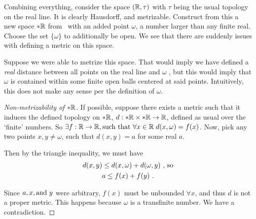 \begin{frame}

    Combining everything, consider the space \((\mathbb{R}, \tau)\) with \(\tau\)
    being the usual topology on the real line. It is clearly Hausdorff, and
    metrizable. \pause Construct from this a new space \(*\mathbb{R}\) from \reals\,
    with an added point \(\omega\), a number larger than any finite real. Choose
    the set \(\{\omega\}\) to additionally be open. \pause We see that there are
    suddenly issues with defining a metric on this space.

\end{frame}

\begin{frame}

    Suppose we were able to metrize this space. That would imply we have defined
    a \emph{real} distance between all points on the real line and \(\omega\)
    \pause, but this would imply that \(\omega\) is contained within some finite
    open balls centered at said points. Intuitively, this does not make any
    sense per the definition of \(\omega\).

\end{frame}

\begin{frame}

    \begin{proof}[Non-metrizability of \(*\mathbb{R}\)]
        If possible, suppose there exists a metric such that it induces the
        defined topology on \(*\mathbb{R}\), \(d:*\mathbb{R} \times *\mathbb{R} \to
        \mathbb{R}\), defined as usual over the `finite' numbers. \pause So
        \(\exists f:\mathbb{R} \to \mathbb{R}, \text{such that }\forall x \in \mathbb{R}
        \;d(x, \omega) = f(x)\). Now, pick any two points \(x, y \not =
        \omega\), such that \(d(x, y) = a\) for some real \(a\). 
        
        \pause 
        Then by the triangle inequality, we must have
        \begin{gather*}
            d(x, y) \leq d(x, \omega) + d(\omega, y) \textnormal{ , so} \\
            a \leq f(x) + f(y)~.
        \end{gather*}

        Since \(a, x, \textnormal{and } y\) were arbitrary, \(f(x)\) must be
        unbounded \(\forall x\), and thus \(d\) is not a proper metric. This
        happens because \(\omega\) is a transfinite number. We have a
        contradiction. 
    \end{proof}

\end{frame}